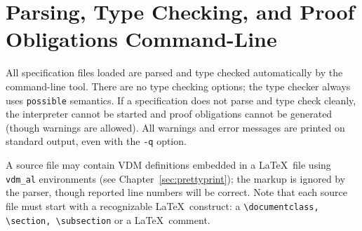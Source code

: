 \documentclass{overturerepchap}
\begin{document}



\section{Parsing, Type Checking, and Proof Obligations Command-Line}

All specification files loaded are parsed and type checked
automatically by the command-line tool. There are no type checking options; the type checker
always uses \texttt{possible} semantics. If a specification does not parse
and type check cleanly, the interpreter cannot be started and proof
obligations cannot be generated (though warnings are allowed). All
warnings and error messages are printed on standard output, even
with the \texttt{-q} option.

A source file may contain VDM definitions embedded
in a \LaTeX\ file using \verb|vdm_al| environments (see
Chapter~\ref{sec:prettyprint}); the markup is ignored by the parser,
though reported line numbers will be correct. Note that each source file
must start with a recognizable \LaTeX\ construct:
a \verb+\documentclass, \section, \subsection+ or a \LaTeX\ comment.
\end{document}
